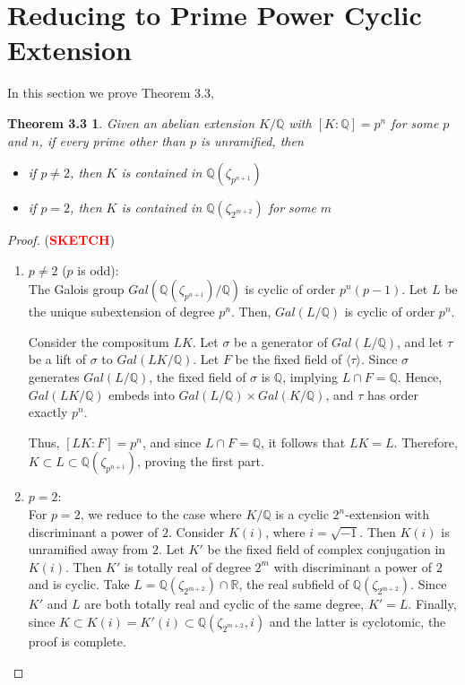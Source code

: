 \section{Reducing to Prime Power Cyclic Extension}
In this section we prove Theorem 3.3,
\newtheorem*{restatementb}{Theorem 3.3}
\begin{restatementb}
Given an abelian extension $K/\mathbb{Q}$ with $[K : \mathbb{Q}]=p^n$ for some $p$ and $n$, if every prime other than $p$ is unramified, then
\begin{itemize}
\item if $p \neq 2$, then $K$ is contained in $\mathbb{Q}({\zeta_{p^{n+1}}})$
\item if $p=2$, then $K$ is contained in $\mathbb{Q}(\zeta_{2^{m+2}})$ for some $m$
\end{itemize}
\end{restatementb}
\begin{proof}(\textcolor{red}{\textbf{SKETCH}})
~\begin{enumerate}
\item $p \neq 2$ ($p$ is odd):\\
    The Galois group $Gal(\mathbb{Q}(\zeta_{p^{n+1}})/\mathbb{Q})$ is cyclic of order $p^n(p - 1)$. Let $L$ be the unique subextension of degree $p^n$. Then, $Gal(L/\mathbb{Q})$ is cyclic of order $p^n$.

    Consider the compositum $LK$. Let $\sigma$ be a generator of $Gal(L/\mathbb{Q})$, and let $\tau$ be a lift of $\sigma$ to $Gal(LK/\mathbb{Q})$. Let $F$ be the fixed field of $\langle \tau \rangle$. Since $\sigma$ generates $Gal(L/\mathbb{Q})$, the fixed field of $\sigma$ is $\mathbb{Q}$, implying $L \cap F = \mathbb{Q}$. Hence, $Gal(LK/\mathbb{Q})$ embeds into $Gal(L/\mathbb{Q}) \times Gal(K/\mathbb{Q})$, and $\tau$ has order exactly $p^n$.
        
    Thus, $[LK : F] = p^n$, and since $L \cap F = \mathbb{Q}$, it follows that $LK = L$. Therefore, $K \subset L \subset \mathbb{Q}(\zeta_{p^{n+1}})$, proving the first part.
\item $p = 2$:\\
    For $p = 2$, we reduce to the case where $K/\mathbb{Q}$ is a cyclic $2^n$-extension with discriminant a power of $2$. Consider $K(i)$, where $i = \sqrt{-1}$. Then $K(i)$ is unramified away from $2$. Let $K'$ be the fixed field of complex conjugation in $K(i)$. Then $K'$ is totally real of degree $2^m$ with discriminant a power of $2$ and is cyclic. Take $L = \mathbb{Q}(\zeta_{2^{m+2}}) \cap \mathbb{R}$, the real subfield of $\mathbb{Q}(\zeta_{2^{m+2}})$. Since $K'$ and $L$ are both totally real and cyclic of the same degree, $K' = L$.
    Finally, since $K \subset K(i) = K'(i) \subset \mathbb{Q}(\zeta_{2^{m+2}}, i)$ and the latter is cyclotomic, the proof is complete.
\end{enumerate}
\end{proof}